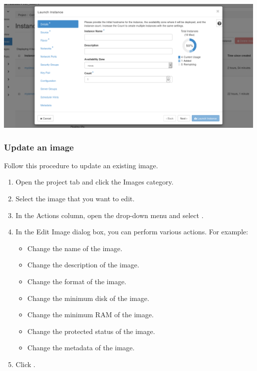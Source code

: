 \begin{center}
\includegraphics[scale=0.5]{img/tab-compute-instances-launch.png}
\end{center}

\subsubsection{Update an image}

Follow this procedure to update an existing image.

\begin{enumerate}
\item Open the project tab and click the Images category.
\item Select the image that you want to edit.
\item In the Actions column, open the drop-down menu and select
  .
\item In the Edit Image dialog box, you can perform various
  actions. For example:
  \begin{itemize}
  \item    Change the name of the image.
  \item    Change the description of the image.
  \item    Change the format of the image.
  \item    Change the minimum disk of the image.
  \item    Change the minimum RAM of the image.
  \item    Change the protected status of the image.
  \item    Change the metadata of the image.
  \end{itemize}
\item  Click .
\end{enumerate}

